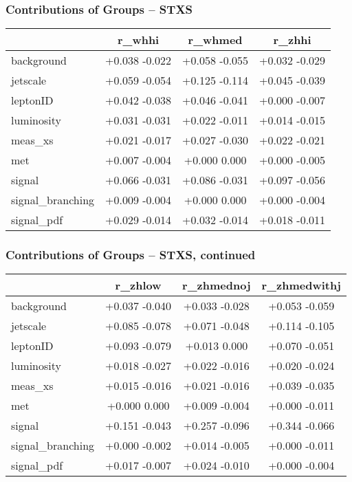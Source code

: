 \documentclass{beamer}
\begin{document}
\begin{frame}
  \frametitle{Contributions of Groups -- STXS}

  \centering
  \begin{tabular}{|l|c|c|c|}
\hline
& r\_whhi & r\_whmed & r\_zhhi \\
\hline
background & +0.038  -0.022 & +0.058  -0.055 & +0.032  -0.029 \\
jetscale & +0.059  -0.054 & +0.125  -0.114 & +0.045  -0.039 \\
leptonID & +0.042  -0.038 & +0.046  -0.041 & +0.000  -0.007 \\
luminosity & +0.031  -0.031 & +0.022  -0.011 & +0.014  -0.015 \\
meas\_xs & +0.021  -0.017 & +0.027  -0.030 & +0.022  -0.021 \\
met & +0.007  -0.004 & +0.000  0.000 & +0.000  -0.005 \\
signal & +0.066  -0.031 & +0.086  -0.031 & +0.097  -0.056 \\
signal\_branching & +0.009  -0.004 & +0.000  0.000 & +0.000  -0.004 \\
signal\_pdf & +0.029  -0.014 & +0.032  -0.014 & +0.018  -0.011 \\
\hline
  \end{tabular}

\end{frame}

\begin{frame}
  \frametitle{Contributions of Groups -- STXS, continued}

  \centering
  \begin{tabular}{|l|c|c|c|}
\hline
& r\_zhlow & r\_zhmednoj & r\_zhmedwithj\\
\hline
background & +0.037  -0.040 & +0.033  -0.028 & +0.053  -0.059\\
jetscale & +0.085  -0.078 & +0.071  -0.048 & +0.114  -0.105\\
leptonID  & +0.093  -0.079 & +0.013  0.000 & +0.070  -0.051\\
luminosity  & +0.018  -0.027 & +0.022  -0.016 & +0.020  -0.024\\
meas\_xs & +0.015  -0.016 & +0.021  -0.016 & +0.039  -0.035\\
met  & +0.000  0.000 & +0.009  -0.004 & +0.000  -0.011\\
signal  & +0.151  -0.043 & +0.257  -0.096 & +0.344  -0.066\\
signal\_branching  & +0.000  -0.002 & +0.014  -0.005 & +0.000  -0.011\\
signal\_pdf & +0.017  -0.007 & +0.024  -0.010 & +0.000  -0.004\\
\hline
  \end{tabular}

\end{frame}
\end{document}
